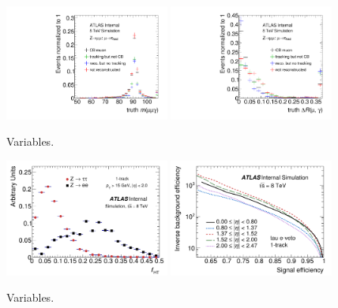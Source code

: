 \begin{figure}[tp]
  \centering
  \includegraphics[width=0.48\textwidth]{figures/tauperformance/muonfakes_mlly}
  \includegraphics[width=0.48\textwidth]{figures/tauperformance/muonfakes_dR}
  \caption{Variables.}
  \label{fig:taus-muonfakes2}
\end{figure}

\begin{figure}[tp]
  \centering
  \includegraphics[width=0.48\textwidth]{figures/PERF-2013-06_tmp/TRTHTOverLT_LeadTrk}
  \includegraphics[width=0.48\textwidth]{figures/PERF-2013-06_tmp/ROC_ymin5_smoothcurve}
  \caption{Variables.}
  \label{fig:taus-electronfakes1}
\end{figure}

